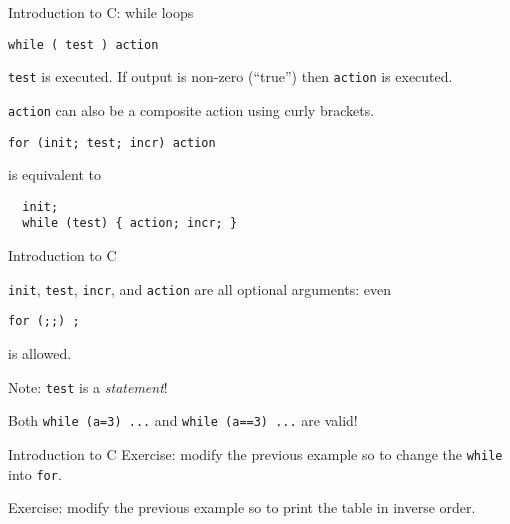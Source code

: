 \begin{frame}[fragile]{Introduction to C: while loops}
\begin{verbatim}
while ( test ) action
\end{verbatim}


\vspace{20pt}

\verb"test" is executed. If output is non-zero (``true'') then
 \verb"action" is executed.

\vspace{20pt}


\verb"action" can also be a composite action
using curly brackets.


\vspace{20pt}

\begin{verbatim}
for (init; test; incr) action
\end{verbatim}

\noindent
is equivalent to
\begin{verbatim}
  init;
  while (test) { action; incr; }
\end{verbatim}


\end{frame}
\begin{frame}[fragile]{Introduction to C}

\verb"init", \verb"test", \verb"incr", and \verb"action" are all optional arguments: even
\begin{center}\tt for (;;) ;\end{center}
is allowed.

\vspace{20pt}

Note: \verb"test" is a {\em statement\/}!

\vspace{20pt}

Both {\tt while (a=3) ...} and {\tt while (a==3) ...} are valid!



\end{frame}
\begin{frame}[fragile]{Introduction to C}
Exercise: modify the previous example so to change the \verb"while" into \verb"for".

\vspace{20pt}

Exercise:  modify the previous example so to print the table in inverse order.


\end{frame}
